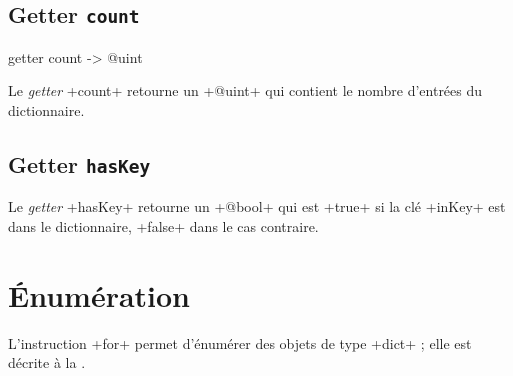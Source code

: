 \subsection{Getter \texttt{count}}

\begin{galgas3}
getter count -> @uint
\end{galgas3}


Le \emph{getter} \ggst+count+ retourne un \ggst+@uint+ qui contient le nombre d'entrées du dictionnaire.



\subsection{Getter \texttt{hasKey}}


Le \emph{getter} \ggst+hasKey+ retourne un \ggst+@bool+ qui est \ggst+true+ si la clé \ggst+inKey+ est dans le dictionnaire, \ggst+false+ dans le cas contraire.



%
%
%



%
%
%

















\section{Énumération}

L'instruction \ggst+for+ permet d'énumérer des objets de type \ggst+dict+ ; elle est décrite à la .

